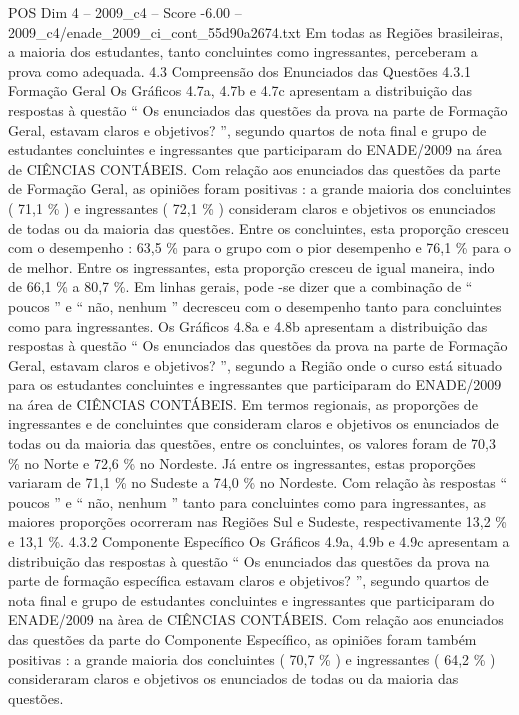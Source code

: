 \begin{textsample}{POS Dim 4 – 2009\_c4 – Score -6.00 – 2009\_c4/enade\_2009\_ci\_cont\_55d90a2674.txt}
Em todas as Regiões brasileiras, a maioria dos estudantes, tanto concluintes como ingressantes, perceberam a prova como adequada. 4.3 Compreensão dos Enunciados das Questões 4.3.1 Formação Geral Os Gráficos 4.7a, 4.7b e 4.7c apresentam a distribuição das respostas à questão “ Os enunciados das questões da prova na parte de Formação Geral, estavam claros e objetivos? ”, segundo quartos de nota final e grupo de estudantes concluintes e ingressantes que participaram do ENADE/2009 na área de CIÊNCIAS CONTÁBEIS.
Com relação aos enunciados das questões da parte de Formação Geral, as opiniões foram positivas : a grande maioria dos concluintes ( 71,1 \% ) e ingressantes ( 72,1 \% ) consideram claros e objetivos os enunciados de todas ou da maioria das questões.
Entre os concluintes, esta proporção cresceu com o desempenho : 63,5 \% para o grupo com o pior desempenho e 76,1 \% para o de melhor.
Entre os ingressantes, esta proporção cresceu de igual maneira, indo de 66,1 \% a 80,7 \%.
Em linhas gerais, pode -se dizer que a combinação de “ poucos ” e “ não, nenhum ” decresceu com o desempenho tanto para concluintes como para ingressantes.
Os Gráficos 4.8a e 4.8b apresentam a distribuição das respostas à questão “ Os enunciados das questões da prova na parte de Formação Geral, estavam claros e objetivos? ”, segundo a Região onde o curso está situado para os estudantes concluintes e ingressantes que participaram do ENADE/2009 na área de CIÊNCIAS CONTÁBEIS.
Em termos regionais, as proporções de ingressantes e de concluintes que consideram claros e objetivos os enunciados de todas ou da maioria das questões, entre os concluintes, os valores foram de 70,3 \% no Norte e 72,6 \% no Nordeste.
Já entre os ingressantes, estas proporções variaram de 71,1 \% no Sudeste a 74,0 \% no Nordeste.
Com relação às respostas “ poucos ” e “ não, nenhum ” tanto para concluintes como para ingressantes, as maiores proporções ocorreram nas Regiões Sul e Sudeste, respectivamente 13,2 \% e 13,1 \%. 4.3.2 Componente Específico Os Gráficos 4.9a, 4.9b e 4.9c apresentam a distribuição das respostas à questão “ Os enunciados das questões da prova na parte de formação específica estavam claros e objetivos? ”, segundo quartos de nota final e grupo de estudantes concluintes e ingressantes que participaram do ENADE/2009 na àrea de CIÊNCIAS CONTÁBEIS.
Com relação aos enunciados das questões da parte do Componente Específico, as opiniões foram também positivas : a grande maioria dos concluintes ( 70,7 \% ) e ingressantes ( 64,2 \% ) consideraram claros e objetivos os enunciados de todas ou da maioria das questões.

\end{textsample}
